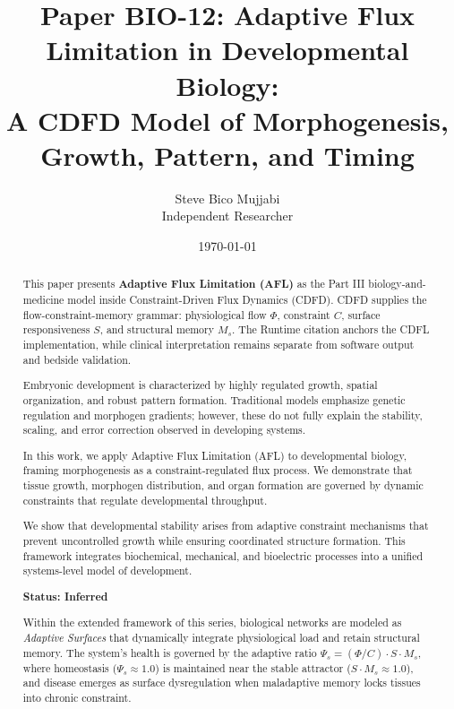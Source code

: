 \documentclass[11pt]{article}
\title{\textbf{Paper BIO-12: Adaptive Flux Limitation in Developmental Biology:\\ A CDFD Model of Morphogenesis, Growth, Pattern, and Timing}}
\author{Steve Bico Mujjabi\\ \small Independent Researcher}
\date{\today}
\begin{document}
\maketitle

\begin{abstract}

This paper presents \textbf{Adaptive Flux Limitation (AFL)} as the Part III biology-and-medicine model inside Constraint-Driven Flux Dynamics (CDFD). CDFD supplies the flow-constraint-memory grammar: physiological flow $\Phi$, constraint $C$, surface responsiveness $S$, and structural memory $M_s$. The Runtime citation anchors the CDFL implementation, while clinical interpretation remains separate from software output and bedside validation.


Embryonic development is characterized by highly regulated growth, spatial organization, and robust pattern formation. Traditional models emphasize genetic regulation and morphogen gradients; however, these do not fully explain the stability, scaling, and error correction observed in developing systems.

In this work, we apply Adaptive Flux Limitation (AFL) to developmental biology, framing morphogenesis as a constraint-regulated flux process. We demonstrate that tissue growth, morphogen distribution, and organ formation are governed by dynamic constraints that regulate developmental throughput.

We show that developmental stability arises from adaptive constraint mechanisms that prevent uncontrolled growth while ensuring coordinated structure formation. This framework integrates biochemical, mechanical, and bioelectric processes into a unified systems-level model of development.

\textbf{Status: Inferred}

\medskip
\noindent Within the extended framework of this series, biological networks are modeled as \emph{Adaptive Surfaces} that dynamically integrate physiological load and retain structural memory. The system's health is governed by the adaptive ratio $\Psi_s = (\Phi/C) \cdot S \cdot M_s$, where homeostasis ($\Psi_s \approx 1.0$) is maintained near the stable attractor ($S \cdot M_s \approx 1.0$), and disease emerges as surface dysregulation when maladaptive memory locks tissues into chronic constraint.

\end{abstract}
\end{document}
